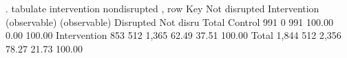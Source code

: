 . tabulate intervention nondisrupted , row
{\smallskip}
{\TLC}
{\VBAR} Key            {\VBAR}
{\LFTT}
{\VBAR}   {}    {\VBAR}
{\VBAR} {} {\VBAR}
{\BLC}
{\smallskip}
             {\VBAR}     Not disrupted
Intervention {\VBAR}     (observable)
(observable) {\VBAR} Disrupted  Not disru {\VBAR}     Total
     Control {\VBAR}       991          0 {\VBAR}       991 
             {\VBAR}    100.00       0.00 {\VBAR}    100.00 
Intervention {\VBAR}       853        512 {\VBAR}     1,365 
             {\VBAR}     62.49      37.51 {\VBAR}    100.00 
       Total {\VBAR}     1,844        512 {\VBAR}     2,356 
             {\VBAR}     78.27      21.73 {\VBAR}    100.00 
{\smallskip}
